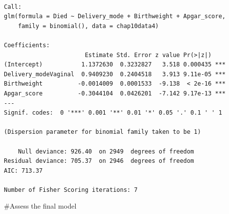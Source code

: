 \documentclass[
  letterpaper,
  DIV=11,
  numbers=noendperiod]{scrartcl}
\newenvironment{Shaded}{\begin{snugshade}}{\end{snugshade}}
\newcommand{\AttributeTok}[1]{\textcolor[rgb]{0.40,0.45,0.13}{#1}}
\newcommand{\CommentTok}[1]{\textcolor[rgb]{0.37,0.37,0.37}{#1}}
\newcommand{\FloatTok}[1]{\textcolor[rgb]{0.68,0.00,0.00}{#1}}
\newcommand{\FunctionTok}[1]{\textcolor[rgb]{0.28,0.35,0.67}{#1}}
\newcommand{\NormalTok}[1]{\textcolor[rgb]{0.00,0.23,0.31}{#1}}
\newcommand{\OtherTok}[1]{\textcolor[rgb]{0.00,0.23,0.31}{#1}}
\newcommand{\SpecialCharTok}[1]{\textcolor[rgb]{0.37,0.37,0.37}{#1}}
\newcommand{\StringTok}[1]{\textcolor[rgb]{0.13,0.47,0.30}{#1}}
\begin{document}
\begin{verbatim}

Call:
glm(formula = Died ~ Delivery_mode + Birthweight + Apgar_score, 
    family = binomial(), data = chap10data4)

Coefficients:
                       Estimate Std. Error z value Pr(>|z|)    
(Intercept)           1.1372630  0.3232827   3.518 0.000435 ***
Delivery_modeVaginal  0.9409230  0.2404518   3.913 9.11e-05 ***
Birthweight          -0.0014009  0.0001533  -9.138  < 2e-16 ***
Apgar_score          -0.3044104  0.0426201  -7.142 9.17e-13 ***
---
Signif. codes:  0 '***' 0.001 '**' 0.01 '*' 0.05 '.' 0.1 ' ' 1

(Dispersion parameter for binomial family taken to be 1)

    Null deviance: 926.40  on 2949  degrees of freedom
Residual deviance: 705.37  on 2946  degrees of freedom
AIC: 713.37

Number of Fisher Scoring iterations: 7
\end{verbatim}

\#Assess the final model

\begin{Shaded}
\end{Shaded}
\end{document}
